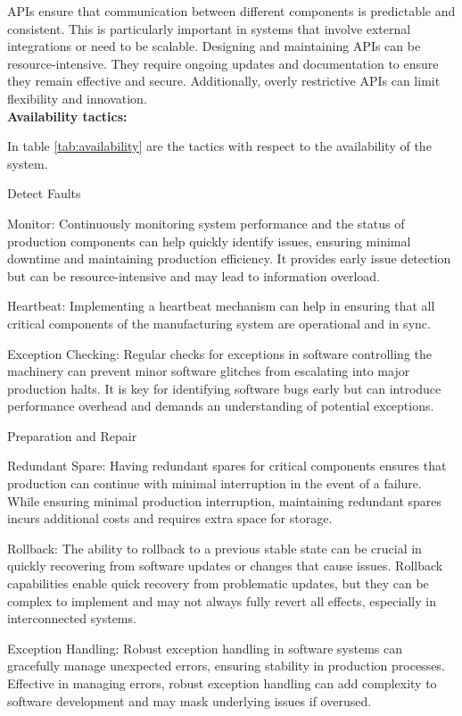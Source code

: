 APIs ensure that communication between different components is predictable and consistent. This is particularly important in systems that involve external integrations or need to be scalable. Designing and maintaining APIs can be resource-intensive. They require ongoing updates and documentation to ensure they remain effective and secure. Additionally, overly restrictive APIs can limit flexibility and innovation.\\


\textbf{Availability tactics:} 

In table \ref{tab:availability} are the tactics with respect to the availability of the system.

Detect Faults

Monitor: Continuously monitoring system performance and the status of production components can help quickly identify issues, ensuring minimal downtime and maintaining production efficiency. It provides early issue detection but can be resource-intensive and may lead to information overload.

Heartbeat: Implementing a heartbeat mechanism can help in ensuring that all critical components of the manufacturing system are operational and in sync.

Exception Checking: Regular checks for exceptions in software controlling the machinery can prevent minor software glitches from escalating into major production halts. It is key for identifying software bugs early but can introduce performance overhead and demands an understanding of potential exceptions.

Preparation and Repair

Redundant Spare: Having redundant spares for critical components ensures that production can continue with minimal interruption in the event of a failure. While ensuring minimal production interruption, maintaining redundant spares incurs additional costs and requires extra space for storage.

Rollback: The ability to rollback to a previous stable state can be crucial in quickly recovering from software updates or changes that cause issues. Rollback capabilities enable quick recovery from problematic updates, but they can be complex to implement and may not always fully revert all effects, especially in interconnected systems.

Exception Handling: Robust exception handling in software systems can gracefully manage unexpected errors, ensuring stability in production processes. Effective in managing errors, robust exception handling can add complexity to software development and may mask underlying issues if overused.

